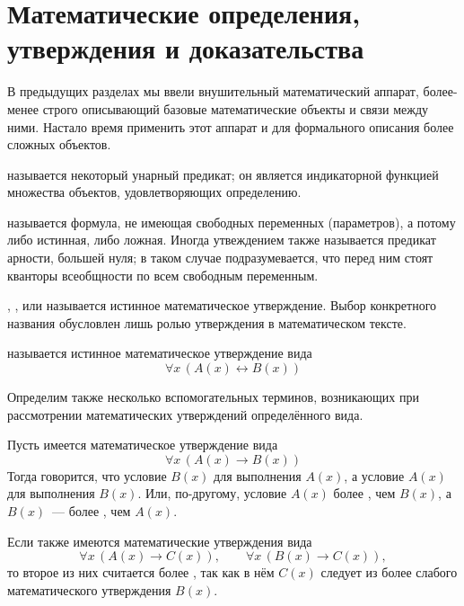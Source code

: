 \section{Математические определения, утверждения и доказательства}
\label{sec:formal_systems}

В предыдущих разделах мы ввели внушительный математический аппарат, более-менее строго описывающий базовые математические объекты и связи между ними.
Настало время применить этот аппарат и для формального описания более сложных объектов.

\begin{definition}
    \label{definition:formal_systems:definition}
     называется некоторый унарный предикат;
    он является индикаторной функцией множества объектов, удовлетворяющих определению.
\end{definition}

\begin{definition}
     называется формула, не имеющая свободных переменных (параметров), а потому либо истинная, либо ложная.
    Иногда утвеждением также называется предикат арности, большей нуля; в таком случае подразумевается, что перед ним стоят кванторы всеобщности по всем свободным переменным.
\end{definition}

\begin{definition}
    , ,  или  называется истинное математическое утверждение.
    Выбор конкретного названия обусловлен лишь ролью утверждения в математическом тексте.
\end{definition}

\begin{definition}
     называется истинное математическое утверждение вида
    \[
        \forall x \, \left( A(x) \leftrightarrow B(x) \right)
    \]
\end{definition}

Определим также несколько вспомогательных терминов, возникающих при рассмотрении математических утверждений определённого вида.
\begin{definition}
    Пусть имеется математическое утверждение вида
    \[
        \forall x \, \left( A(x) \rightarrow B(x) \right)
    \]
    Тогда говорится, что условие $ B(x) $  для выполнения $ A(x) $, а условие $ A(x) $  для выполнения $ B(x) $.
    Или, по-другому, условие $ A(x) $ более , чем $ B(x) $, а $ B(x) $~--- более , чем $ A(x) $.

    Если также имеются математические утверждения вида
    \[
        \forall x \, \left( A(x) \rightarrow C(x) \right), \qquad
        \forall x \, \left( B(x) \rightarrow C(x) \right),
    \]
    то второе из них считается более , так как в нём $ C(x) $ следует из более слабого математического утверждения $ B(x) $.
\end{definition}



